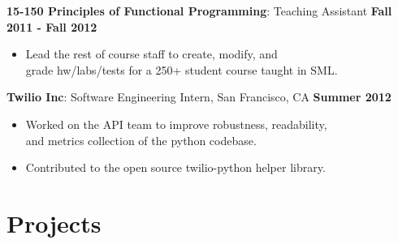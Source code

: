 \documentclass[sectioned]{dsyangres}
\begin{document}
\begin{resume}
\textbf{15-150 Principles of Functional
 Programming}: Teaching Assistant \hfill \textbf{Fall 2011 - Fall 2012}
 \begin{itemize} \itemsep -2pt
   \item Lead the rest of course staff to create, modify, and\\
     grade hw/labs/tests for a 250+ student course taught in SML.
 \end{itemize}

\textbf{Twilio Inc}: Software Engineering Intern,
 San Francisco, CA \hfill \textbf{Summer 2012}
  \begin{itemize} \itemsep -2pt
    \item Worked on the API team to improve robustness, readability, \\
      and metrics collection of the python codebase.
    \item Contributed to the open source twilio-python helper library.
  \end{itemize}




\section{Projects}


\end{resume}
\end{document}
